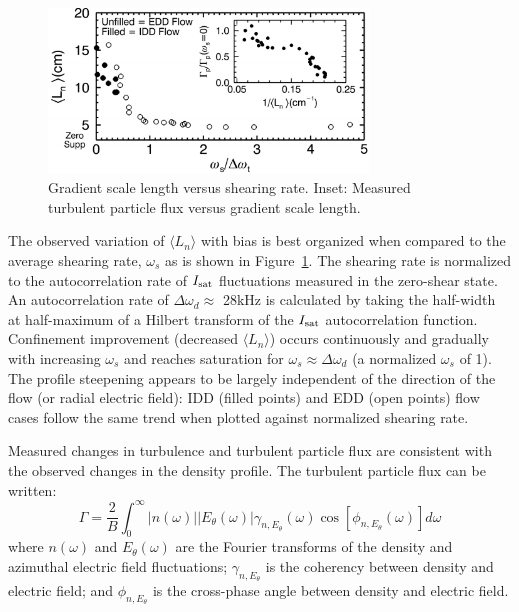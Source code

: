 \documentclass[aps,prl,amsmath,amssymb,preprint,superscriptaddress]{revtex4}
\begin{document}
\begin{figure}[!htbp]
\centerline{
\includegraphics[width=8.5cm]{shearandgrad}}
\caption{\label{fig:shearandgrad} Gradient scale length versus
  shearing rate. Inset: Measured turbulent particle flux versus
  gradient scale length.}
\end{figure}

The observed variation of $\langle L_{n} \rangle$ with bias is best
organized when compared to the average shearing rate, $\omega_s$ as is
shown in Figure~\ref{fig:shearandgrad}.   The shearing rate is
normalized to the autocorrelation rate of $I_{\rm sat}$ fluctuations
measured in the zero-shear state.  An autocorrelation rate of $\Delta
\omega_{d} \approx $ 28kHz is calculated by taking the half-width at
half-maximum of a Hilbert transform of the $I_{\rm sat}$
autocorrelation function.  Confinement improvement (decreased $\langle
L_n \rangle$) occurs continuously and gradually with increasing
$\omega_{s}$ and reaches saturation for $\omega_{s} \approx \Delta
\omega_{d}$ (a normalized $\omega_s$ of 1).  The profile steepening
appears to be largely independent of the direction of the flow (or radial electric field): IDD (filled points) and EDD (open points) flow cases follow the same trend when plotted against normalized shearing rate.

Measured changes in turbulence and turbulent particle flux are
consistent with the observed changes in the density profile.  The
turbulent particle flux can be written\cite{powers74}:
\begin{equation}
\Gamma = \frac{2}{B} \int^{\infty}_{0} \lvert n(\omega) \rvert \lvert E_{\theta}(\omega) \rvert \gamma_{n,E_{\theta}}(\omega) \cos [\phi_{n,E_{\theta}}(\omega)] d\omega
\label{eq:fluxint}
\end{equation}
where $n(\omega)$ and $E_\theta(\omega)$ are the Fourier transforms of
the density and azimuthal electric field fluctuations;
$\gamma_{n,E_\theta}$ is the coherency between density and electric
field; and $\phi_{n,E_\theta}$ is the cross-phase angle between
density and electric field.
\end{document}
